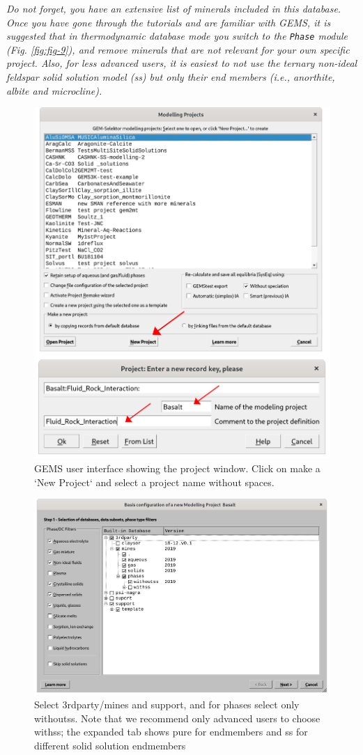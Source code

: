 \documentclass[
]{book}
\begin{document}
\emph{Do not forget, you have an extensive list of minerals included in this database. Once you have gone through the tutorials and are familiar with GEMS, it is suggested that in thermodynamic database mode you switch to the \texttt{Phase} module (Fig. \ref{fig:fig-9}), and remove minerals that are not relevant for your own specific project. Also, for less advanced users, it is easiest to not use the ternary non-ideal feldspar solid solution model (ss) but only their end members (i.e., anorthite, albite and microcline).}

\begin{figure}
\includegraphics[width=0.7\linewidth]{figures/module1/fig-4} \caption{GEMS user interface showing the project window. Click on make a `New Project` and select a project name without spaces.}\label{fig:fig-4}
\end{figure}

\begin{figure}
\includegraphics[width=0.7\linewidth]{figures/module1/fig-5} \caption{Select 3rdparty/mines and support, and for phases select only withoutss. Note that we recommend only advanced users to choose withss; the expanded tab shows pure for endmembers and ss for different solid solution endmembers}\label{fig:fig-5}
\end{figure}
\end{document}
